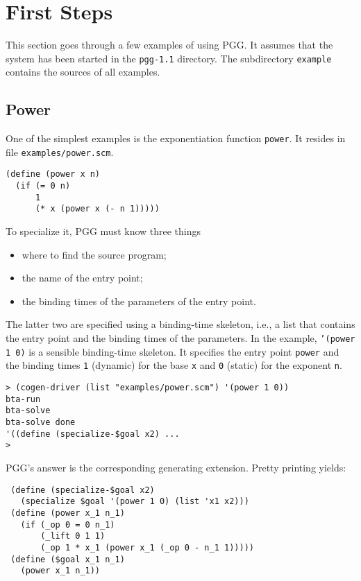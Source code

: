 \documentclass[11pt]{article}
\makeatletter
\newcommand{\indextt}[1]{\index{#1@\texttt{#1}}}
\makeatother
\begin{document}
\section{First Steps}
\label{sec:first-steps}

This section goes through a few examples of using PGG. It assumes that
the system has been started in the \texttt{pgg-1.1} directory. The
subdirectory \texttt{example} contains the sources of all examples.


\subsection{Power}

One of the simplest examples is the exponentiation function \texttt{power}. It
resides in file \texttt{examples/power.scm}. 
\begin{verbatim}
(define (power x n)
  (if (= 0 n)
      1
      (* x (power x (- n 1))))) 
\end{verbatim}
To specialize it, PGG must know three things
\begin{itemize}
\item where to find the source program;
\item the name of the entry point;
\item the binding times of the parameters of the entry point.
\end{itemize}
The latter two are specified using a binding-time skeleton,
i.e., a list that contains the entry point and the binding times of
the parameters. In the example, \texttt{'(power 1 0)} is a sensible
binding-time skeleton. It specifies the entry point \texttt{power} and
the binding times \texttt{1} (dynamic) for the base \texttt{x} and \texttt{0}
(static) for the exponent \texttt{n}.
\indextt{cogen-driver}
\begin{small}
\begin{verbatim}
> (cogen-driver (list "examples/power.scm") '(power 1 0))
bta-run
bta-solve
bta-solve done
'((define (specialize-$goal x2) ...
> 
\end{verbatim}
\end{small}%
PGG's answer is the corresponding generating extension. Pretty
printing yields:
\begin{small}
\begin{verbatim}
 (define (specialize-$goal x2)
   (specialize $goal '(power 1 0) (list 'x1 x2)))
 (define (power x_1 n_1)
   (if (_op 0 = 0 n_1)
       (_lift 0 1 1)
       (_op 1 * x_1 (power x_1 (_op 0 - n_1 1)))))
 (define ($goal x_1 n_1)
   (power x_1 n_1))
\end{verbatim}
\end{small}%
\end{document}
